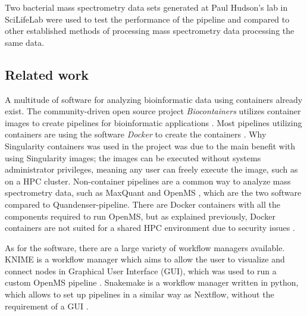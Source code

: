 Two bacterial mass spectrometry data sets generated at Paul Hudson's lab in SciLifeLab were used to test the performance of the pipeline and compared to other established methods of processing mass spectrometry data processing the same data.

\subsection{Related work}
A multitude of software for analyzing bioinformatic data using containers already exist. The community-driven open source project \textit{Biocontainers} utilizes container images to create pipelines for bioinformatic applications \cite{biocontainers}. Most pipelines utilizing containers are using the software \textit{Docker} to create the containers \cite{docker}. Why Singularity containers was used in the project was due to the main benefit with using Singularity images; the images can be executed without systems administrator privileges, meaning any user can freely execute the image, such as on a HPC cluster. Non-container pipelines are a common way to analyze mass spectrometry data, such as MaxQuant and OpenMS \cite{maxquant} \cite{openms}, which are the two software compared to Quandenser-pipeline. There are Docker containers with all the components required to run OpenMS, but as explained previously, Docker containers are not suited for a shared HPC environment due to security issues \cite{openms-hpc}.

As for the software, there are a large variety of workflow managers available. KNIME is a workflow manager which aims to allow the user to visualize and connect nodes in Graphical User Interface (GUI), which was used to run a custom OpenMS pipeline \cite{knime}. Snakemake is a workflow manager written in python, which allows to set up pipelines in a similar way as Nextflow, without the requirement of a GUI \cite{snakemake}.

